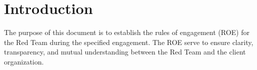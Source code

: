 \section*{Introduction}


The purpose of this document is to establish the rules of engagement (ROE) for the Red Team during the specified engagement. The ROE serve to ensure clarity, transparency, and mutual understanding between the Red Team and the client organization.
